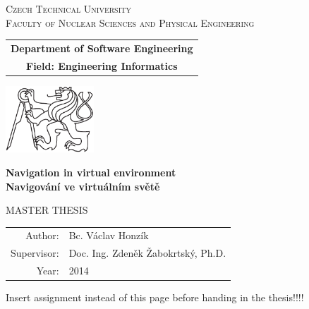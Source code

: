 \documentclass[a4paper,12pt,twoside]{report}
\newcommand{\cvut}{Czech Technical University}
\newcommand{\fjfi}{Faculty of Nuclear Sciences and Physical Engineering}
\newcommand{\kse}{Department of Software Engineering}
\newcommand{\obor}{Engineering Informatics}
\newcommand{\nazevcz}{Navigování ve virtuálním světě}        %
\newcommand{\nazeven}{Navigation in virtual environment}     %
\newcommand{\autor}{Bc. Václav Honzík}           %
\newcommand{\rok}{2014}                %
\newcommand{\vedouci}{Doc. Ing. Zdeněk Žabokrtský, Ph.D.}         %
\begin{document}
\thispagestyle{empty}

\begin{center}
    {\Large \textsc{\cvut}\\[1.5ex] \textsc{\fjfi}}\\
    \vspace{10mm}
    
    \begin{tabular}{c}
	    {\bf \kse}\\   
      {\bf Field: \obor}\\
    \end{tabular}


   \vspace{10mm} \includegraphics[height=25mm]{cvut-logo-bw} \vspace{15mm}
 

   {\huge \bf \nazeven}\\
   \vspace{5mm}   
   {\huge \bf \nazevcz}

   \vspace{15mm}
   {\Large MASTER THESIS}

   \vfill
   {\large
    \begin{tabular}{rl}
    Author: & \autor\\
    Supervisor: & \vedouci\\
    Year: & \rok
    \end{tabular}
   }
\end{center}

\newpage  %
\thispagestyle{empty} Insert assignment instead of this page before handing in the thesis!!!!
\end{document}

